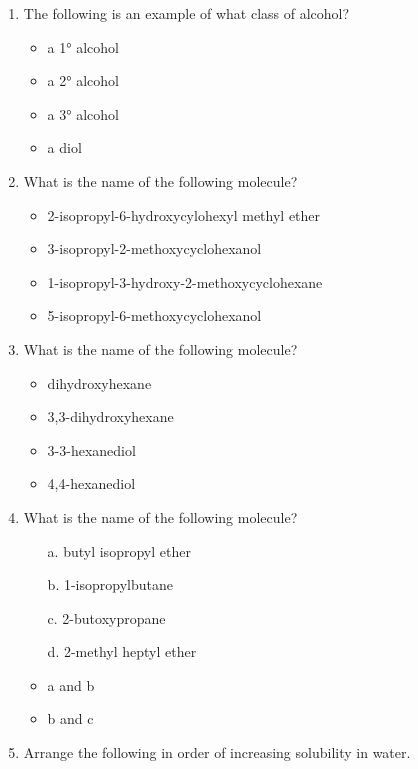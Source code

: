 \documentclass[12pt,a4paper]{article}
\begin{document}
\begin{enumerate}\color{G-Moon}
    \item The following is an example of what class of alcohol?

    
    \begin{itemize}
        \item a \ang{1} alcohol
        \item {\color{o-Sun}a \ang{2} alcohol}
        \item a \ang{3} alcohol 
        \item a diol
    \end{itemize}
    \item What is the name of the following molecule?


    \begin{itemize}
        \item 2-isopropyl-6-hydroxycylohexyl methyl ether
        \item {\color{o-Sun}3-isopropyl-2-methoxycyclohexanol}
        \item 1-isopropyl-3-hydroxy-2-methoxycyclohexane
        \item 5-isopropyl-6-methoxycyclohexanol
    \end{itemize}
    \item What is the name of the following molecule?


    \begin{itemize}
        \item dihydroxyhexane
        \item 3,3-dihydroxyhexane
        \item {\color{o-Sun}3-3-hexanediol}
        \item 4,4-hexanediol
    \end{itemize}
    \item What is the name of the following molecule?


    \begin{itemize}
        \item[a.] butyl isopropyl ether
        \item[b.] 1-isopropylbutane
        \item[c.] 2-butoxypropane
        \item[d.] 2-methyl heptyl ether
        \item {\color{o-Sun}a and b}
        \item b and c
    \end{itemize}
    \item Arrange the following in order of increasing solubility in water.


\end{enumerate}
\end{document}
